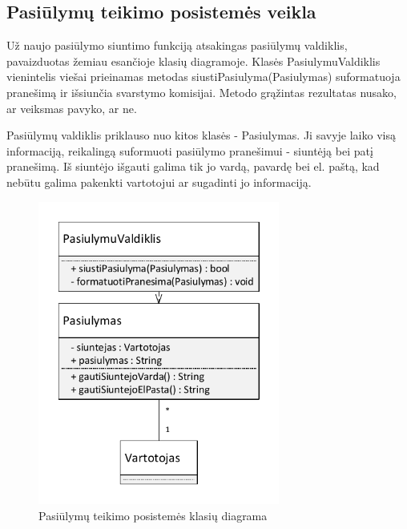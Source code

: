\documentclass{VUMIFPSkursinis}
\begin{document}
		\subsection*{Pasiūlymų teikimo posistemės veikla}
		Už naujo pasiūlymo siuntimo funkciją atsakingas pasiūlymų valdiklis, pavaizduotas žemiau esančioje klasių diagramoje.
		Klasės PasiulymuValdiklis vienintelis viešai prieinamas metodas siustiPasiulyma(Pasiulymas) suformatuoja pranešimą ir išsiunčia svarstymo komisijai. Metodo
		grąžintas rezultatas nusako, ar veiksmas pavyko, ar ne. \par
		Pasiūlymų valdiklis priklauso nuo kitos klasės - Pasiulymas. Ji savyje laiko visą informaciją, reikalingą suformuoti pasiūlymo pranešimui - siuntėją bei patį pranešimą.
		Iš siuntėjo išgauti galima tik jo vardą, pavardę bei el. paštą, kad nebūtu galima pakenkti vartotojui ar sugadinti jo informaciją.
		\begin{figure}[H]
			\centering
			\includegraphics[width=\textwidth, height=10cm, keepaspectratio]{img/KlasiuDiagramaPasiulymai}
			\caption{Pasiūlymų teikimo posistemės klasių diagrama}
			\label{fig:PasiulymuKlasiuDiagrama}
		\end{figure}
\end{document}
